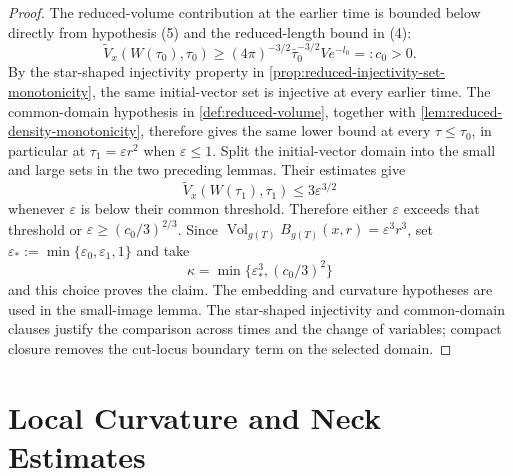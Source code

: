 \begin{proof}
The reduced-volume contribution at the earlier time is bounded below directly
from hypothesis (5) and the reduced-length bound in (4):
\[
 \widetilde V_x(W(\tau_0),\tau_0)
 \ge (4\pi)^{-3/2}\bar\tau_0^{-3/2}Ve^{-l_0}=:c_0>0.
\]
By the star-shaped injectivity property in
\ref{prop:reduced-injectivity-set-monotonicity}, the same initial-vector set is injective
at every earlier time.  The common-domain hypothesis in
\ref{def:reduced-volume}, together with
\ref{lem:reduced-density-monotonicity}, therefore gives the same lower bound
at every $\tau\le\tau_0$, in particular at $\tau_1=\varepsilon r^2$ when
$\varepsilon\le1$.  Split the initial-vector domain into the small and large
sets in the two preceding lemmas.  Their estimates give
\[
 \widetilde V_x(W(\tau_1),\tau_1)
 \le3\varepsilon^{3/2}
\]
whenever $\varepsilon$ is below their common threshold.  Therefore either
$\varepsilon$ exceeds that threshold or
$\varepsilon\ge(c_0/3)^{2/3}$.  Since
$\operatorname{Vol}_{g(T)}B_{g(T)}(x,r)=\varepsilon^3r^3$, set
$\varepsilon_*:=\min\{\varepsilon_0,\varepsilon_1,1\}$ and take
\[
 \kappa=\min\{\varepsilon_*^3,(c_0/3)^2\}
\]
and this choice proves the claim.  The embedding and curvature hypotheses are
used in the small-image lemma.  The star-shaped injectivity and common-domain
clauses justify the comparison across times and the change of variables;
compact closure removes the cut-locus boundary term on the selected domain.
\end{proof}

\section{Local Curvature and Neck Estimates}

